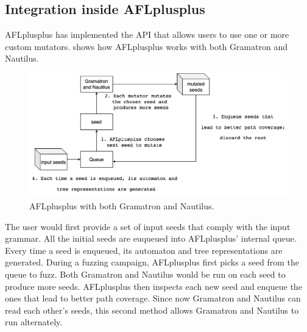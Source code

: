 \subsection{Integration inside AFLplusplus}
AFLplusplus has implemented the API that allows users to use one or more custom mutators.  shows how AFLplusplus works with both Gramatron and Nautilus.

\begin{figure}[]
  \centering
  \includegraphics[scale=0.28]{images/AFLplusplus.png}
  
  \caption{AFLplusplus with both Gramatron and Nautilus.}\label{aflplusplus}
\end{figure}

The user would first provide a set of input seeds that comply with the input grammar. All the initial seeds are euqueued into AFLplusplus' internal queue. Every time a seed is enqueued, its automaton and tree representations are generated. During a fuzzing campaign, AFLplusplus first picks a seed from the queue to fuzz. Both Gramatron and Nautilus would be run on each seed to produce more seeds. AFLplusplus then inspects each new seed and enqueue the ones that lead to better path coverage. Since now Gramatron and Nautilus can read each other's seeds, this second method allows Gramatron and Nautilus to run alternately.


